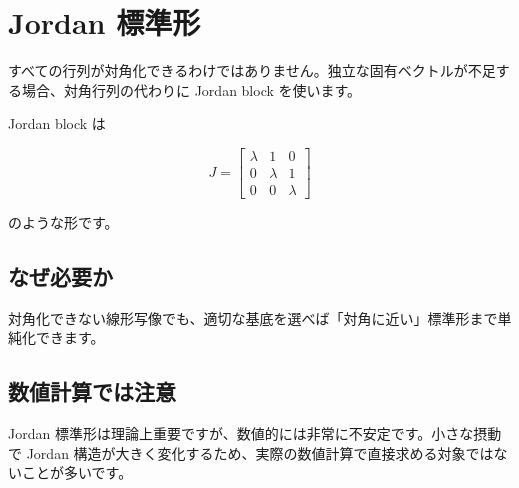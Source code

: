 \documentclass[
  11pt,
  a4paper,
]{ltjsarticle}
\author{}
\date{}
\begin{document}
\hypertarget{jordan-ux6a19ux6e96ux5f62}{%
\section{Jordan 標準形}\label{jordan-ux6a19ux6e96ux5f62}}

すべての行列が対角化できるわけではありません。独立な固有ベクトルが不足する場合、対角行列の代わりに
Jordan block を使います。

Jordan block は

\[
J=\begin{bmatrix}
\lambda&1&0\\
0&\lambda&1\\
0&0&\lambda
\end{bmatrix}
\]

のような形です。

\hypertarget{ux306aux305cux5fc5ux8981ux304b}{%
\subsection{なぜ必要か}\label{ux306aux305cux5fc5ux8981ux304b}}

対角化できない線形写像でも、適切な基底を選べば「対角に近い」標準形まで単純化できます。

\hypertarget{ux6570ux5024ux8a08ux7b97ux3067ux306fux6ce8ux610f}{%
\subsection{数値計算では注意}\label{ux6570ux5024ux8a08ux7b97ux3067ux306fux6ce8ux610f}}

Jordan
標準形は理論上重要ですが、数値的には非常に不安定です。小さな摂動で
Jordan
構造が大きく変化するため、実際の数値計算で直接求める対象ではないことが多いです。
\end{document}
